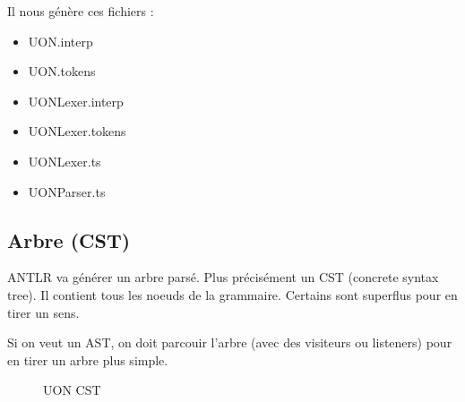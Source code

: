 \documentclass[
    iict, %
    il, %
]{heig-tb}
\begin{document}
Il nous génère ces fichiers :
\begin{itemize}
    \item UON.interp
    \item UON.tokens
    \item UONLexer.interp
    \item UONLexer.tokens
    \item UONLexer.ts
    \item UONParser.ts
\end{itemize}

\subsection{Arbre (CST)}


ANTLR va générer un arbre parsé. Plus précisément un CST (concrete syntax tree).
Il contient tous les noeuds de la grammaire. Certains sont superflus pour en tirer un sens.

Si on veut un AST, on doit parcouir l'arbre (avec des visiteurs ou listeners) pour en tirer un arbre plus simple.

\begin{figure}[!h]
    \begin{center}
    \end{center}
    \caption[UON CST]{\label{uon-tree} UON CST}
\end{figure}
\end{document}
